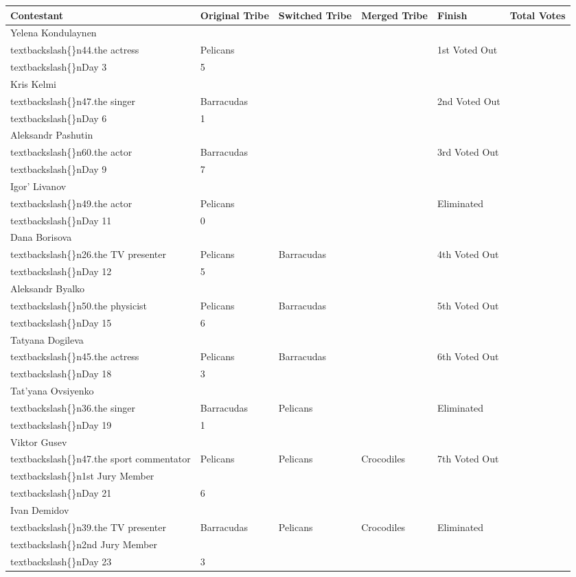 \documentclass{article}
\begin{document}
\begin{tabular}{llllll}
\toprule
Contestant & Original Tribe & Switched Tribe & Merged Tribe & Finish & Total Votes \\
\midrule
Yelena Kondulaynen\\textbackslash\{\}n44.the actress & Pelicans &  &  & 1st Voted Out\\textbackslash\{\}nDay 3 & 5 \\
Kris Kelmi\\textbackslash\{\}n47.the singer & Barracudas &  &  & 2nd Voted Out\\textbackslash\{\}nDay 6 & 1 \\
Aleksandr Pashutin\\textbackslash\{\}n60.the actor & Barracudas &  &  & 3rd Voted Out\\textbackslash\{\}nDay 9 & 7 \\
Igor' Livanov\\textbackslash\{\}n49.the actor & Pelicans &  &  & Eliminated\\textbackslash\{\}nDay 11 & 0 \\
Dana Borisova\\textbackslash\{\}n26.the TV presenter & Pelicans & Barracudas &  & 4th Voted Out\\textbackslash\{\}nDay 12 & 5 \\
Aleksandr Byalko\\textbackslash\{\}n50.the physicist & Pelicans & Barracudas &  & 5th Voted Out\\textbackslash\{\}nDay 15 & 6 \\
Tatyana Dogileva\\textbackslash\{\}n45.the actress & Pelicans & Barracudas &  & 6th Voted Out\\textbackslash\{\}nDay 18 & 3 \\
Tat'yana Ovsiyenko\\textbackslash\{\}n36.the singer & Barracudas & Pelicans &  & Eliminated\\textbackslash\{\}nDay 19 & 1 \\
Viktor Gusev\\textbackslash\{\}n47.the sport commentator & Pelicans & Pelicans & Crocodiles & 7th Voted Out\\textbackslash\{\}n1st Jury Member\\textbackslash\{\}nDay 21 & 6 \\
Ivan Demidov\\textbackslash\{\}n39.the TV presenter & Barracudas & Pelicans & Crocodiles & Eliminated\\textbackslash\{\}n2nd Jury Member\\textbackslash\{\}nDay 23 & 3 \\

\end{tabular}
\end{document}
